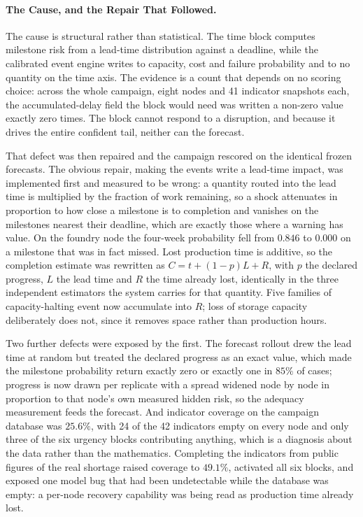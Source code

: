 \paragraph{The Cause, and the Repair That Followed.}
The cause is structural rather than statistical. The time block computes milestone risk from a lead-time distribution against a deadline, while the calibrated event engine writes to capacity, cost and failure probability and to no quantity on the time axis. The evidence is a count that depends on no scoring choice: across the whole campaign, eight nodes and 41 indicator snapshots each, the accumulated-delay field the block would need was written a non-zero value exactly zero times. The block cannot respond to a disruption, and because it drives the entire confident tail, neither can the forecast.

That defect was then repaired and the campaign rescored on the identical frozen forecasts. The obvious repair, making the events write a lead-time impact, was implemented first and measured to be wrong: a quantity routed into the lead time is multiplied by the fraction of work remaining, so a shock attenuates in proportion to how close a milestone is to completion and vanishes on the milestones nearest their deadline, which are exactly those where a warning has value. On the foundry node the four-week probability fell from $0.846$ to $0.000$ on a milestone that was in fact missed. Lost production time is additive, so the completion estimate was rewritten as $C = t + (1-p)L + R$, with $p$ the declared progress, $L$ the lead time and $R$ the time already lost, identically in the three independent estimators the system carries for that quantity. Five families of capacity-halting event now accumulate into $R$; loss of storage capacity deliberately does not, since it removes space rather than production hours.

Two further defects were exposed by the first. The forecast rollout drew the lead time at random but treated the declared progress as an exact value, which made the milestone probability return exactly zero or exactly one in $85\%$ of cases; progress is now drawn per replicate with a spread widened node by node in proportion to that node's own measured hidden risk, so the adequacy measurement feeds the forecast. And indicator coverage on the campaign database was $25.6\%$, with 24 of the 42 indicators empty on every node and only three of the six urgency blocks contributing anything, which is a diagnosis about the data rather than the mathematics. Completing the indicators from public figures of the real shortage raised coverage to $49.1\%$, activated all six blocks, and exposed one model bug that had been undetectable while the database was empty: a per-node recovery capability was being read as production time already lost.

